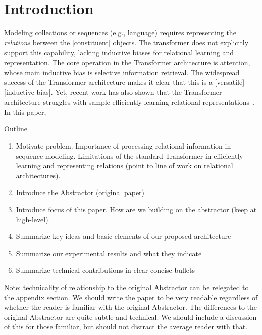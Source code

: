 \section{Introduction}\label{sec:intro}

Modeling collections or sequences (e.g., language) requires representing the \textit{relations} between the [constituent] objects. The transformer does not explicitly support this capability, lacking inductive biases for relational learning and representation. The core operation in the Transformer architecture is attention, whose main inductive bias is selective information retrieval. The widespread success of the Transformer architecture makes it clear that this is a [versatile] [inductive bias]. Yet, recent work has also shown that the Transformer architecture struggles with sample-efficiently learning relational representations~\citep{relnet,predinet,esbn,corelnet,relconvnet}. In this paper, 

Outline
\begin{enumerate}
  \item Motivate problem. Importance of processing relational information in sequence-modeling. Limitations of the standard Transformer in efficiently learning and representing relations (point to line of work on relational architectures).
  \item Introduce the Abstractor (original paper)
  \item Introduce focus of this paper. How are we building on the abstractor (keep at high-level).
  \item Summarize key ideas and basic elements of our proposed architecture
  \item Summarize our experimental results and what they indicate
  \item Summarize technical contributions in clear concise bullets
\end{enumerate}

Note: technicality of relationship to the original Abstractor can be relegated to the appendix section. We should write the paper to be very readable regardless of whether the reader is familiar with the original Abstractor. The differences to the original Abstractor are quite subtle and technical. We should include a discussion of this for those familiar, but should not distract the average reader with that.
